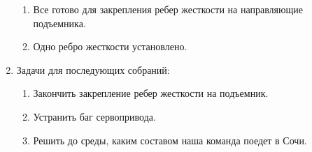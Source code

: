 \begin{enumerate}
\begin{enumerate}
      \item Все готово для закрепления ребер жесткости на направляющие подъемника.\newline
      
      \item Одно ребро жесткости установлено.\newline
      
    \end{enumerate}
    
	\item Задачи для последующих собраний:\newline
	\begin{enumerate}
	  \item Закончить закрепление ребер жесткости на подъемник.\newline
	  
	  \item Устранить баг сервопривода.\newline
	  
	  \item	Решить до среды, каким составом наша команда поедет в Сочи.\newline
	  
    \end{enumerate}     
\end{enumerate}

\fillpage
